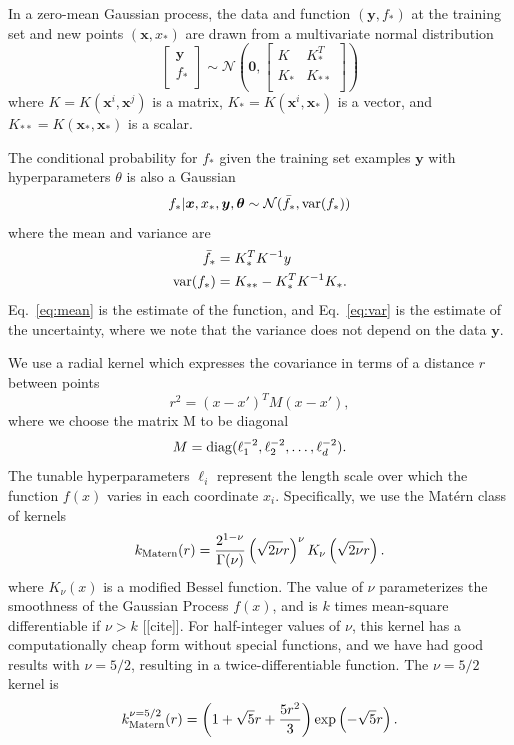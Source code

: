 \documentclass[prd,aps,letter,twocolumn,floatfix,notitlepage,nofootinbib]{revtex4-1}
\begin{document}
In a zero-mean Gaussian process, the data and function $({\bm y}, f_*)$ at the training set and new points $({\bm x}, x_*)$ are
drawn from a multivariate normal distribution
\begin{equation}
\label{eq:gaussian}
\begin{bmatrix}
{\bm y} \\
f_* \\
\end{bmatrix}
\sim \mathcal{N}
\left({\bm 0}, 
\begin{bmatrix}
K & K_*^T \\
K_* & K_{**} \\
\end{bmatrix}
\right)
\end{equation}
where $K = K({\bm x}^i, {\bm x}^j)$ is a matrix, $K_* = K({\bm x}^i, {\bm x}_*)$ is a vector, and $K_{**} = K({\bm x}_*, {\bm x}_*)$ is a scalar.

The conditional probability for $f_*$ given the training set examples ${\bm y}$ with hyperparameters $\theta$ is also a Gaussian
\begin{equation}
f_* | {\bm x}, x_*, {\bm y}, {\bm \theta} \sim \mathcal{N}(\bar f_*, {\rm var}(f_*))
\end{equation}
where the mean and variance are
\begin{align}
\label{eq:mean}
\bar f_* &= K_*^T K^{-1} y \\
\label{eq:var}
{\rm var}(f_*) &= K_{**} - K_*^T K^{-1} K_*.
\end{align}
Eq.~\eqref{eq:mean} is the estimate of the function, and Eq.~\eqref{eq:var} is the estimate of the uncertainty, where we note that the variance does not depend on the data $\bm{y}$.

We use a radial kernel which expresses the covariance in terms of a distance $r$ between points
\begin{equation}
r^2 = (x-x')^T M (x-x'),
\end{equation}
where we choose the matrix M to be diagonal
\begin{equation}
M = {\rm diag}(\ell_1^{-2}, \ell_2^{-2}, \dots, \ell_d^{-2}).
\end{equation}
The tunable hyperparameters $\ell_i$ represent the length scale over which the function $f(x)$ varies in 
each coordinate $x_i$. Specifically, we use the Mat\'{e}rn class of kernels
\begin{equation}
k_{\rm Matern}(r) = \frac{2^{1-\nu}}{\Gamma(\nu)} \left(\sqrt{2\nu} r\right)^\nu K_\nu \left(\sqrt{2\nu} r \right).
\end{equation}
where $K_\nu(x)$ is a modified Bessel function. The value of $\nu$ parameterizes the smoothness of the 
Gaussian Process $f(x)$, and is $k$ times mean-square differentiable if $\nu>k$ [[cite]]. For half-integer values of $\nu$, this 
kernel has a computationally cheap form without special functions, and we have had good results with $\nu=5/2$, 
resulting in a twice-differentiable function. The $\nu=5/2$ kernel is
\begin{equation}
k_{\rm Matern}^{\nu=5/2}(r) = \left(1+\sqrt{5}r + \frac{5r^2}{3}\right) \exp\left(-\sqrt{5}r\right).
\end{equation}
\end{document}
